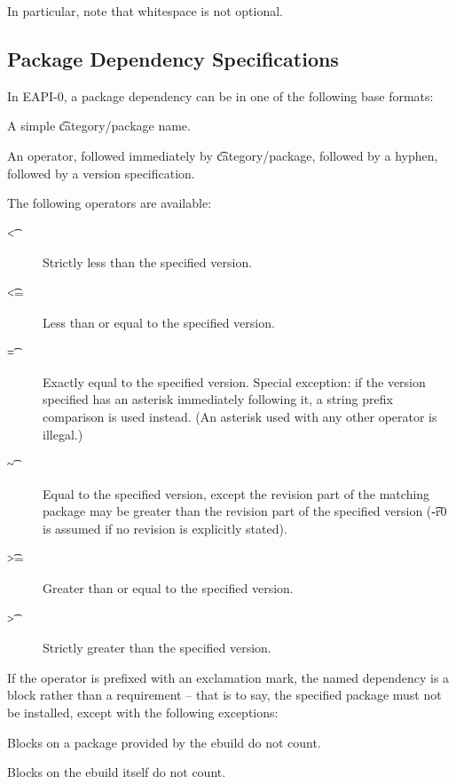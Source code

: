 In particular, note that whitespace is not optional.

\subsection{Package Dependency Specifications}

In EAPI-0, a package dependency can be in one of the following base formats:

\begin{bulletlist}
\item A simple \t{category/package} name.
\item An operator, followed immediately by \t{category/package}, followed by a hyphen,
   followed by a version specification.
\end{bulletlist}

The following operators are available:

\begin{description}
\item[\t{<}] Strictly less than the specified version.
\item[\t{<=}] Less than or equal to the specified version.
\item[\t{=}] Exactly equal to the specified version. Special exception: if the version
    specified has an asterisk immediately following it, a string prefix comparison is
    used instead. (An asterisk used with any other operator is illegal.)
\item[\t{\~}] Equal to the specified version, except the revision part of the matching
    package may be greater than the revision part of the specified version (\t{-r0} is
    assumed if no revision is explicitly stated).
\item[\t{>=}] Greater than or equal to the specified version.
\item[\t{>}] Strictly greater than the specified version.
\end{description}

If the operator is prefixed with an exclamation mark, the named dependency is a block
rather than a requirement -- that is to say, the specified package must not be
installed, except with the following exceptions:

\begin{bulletlist}
\item Blocks on a package provided by the ebuild do not count.
\item Blocks on the ebuild itself do not count.
\end{bulletlist}

